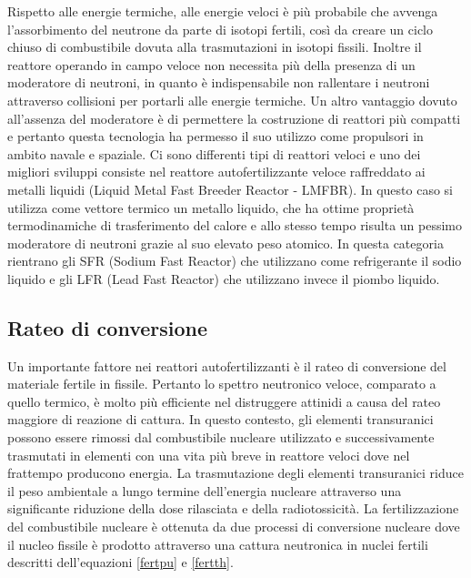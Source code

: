 Rispetto alle energie
termiche, alle energie veloci è più probabile che avvenga l'assorbimento del neutrone da parte di isotopi fertili, 
così da creare un ciclo chiuso di combustibile dovuta alla trasmutazioni in isotopi fissili.
Inoltre il reattore operando in campo veloce non necessita più della presenza 
di un moderatore di neutroni, in quanto è indispensabile non rallentare i neutroni 
attraverso collisioni per portarli alle energie termiche.
Un altro vantaggio dovuto all'assenza del moderatore è di permettere la costruzione di 
reattori più compatti e pertanto questa tecnologia ha permesso il suo utilizzo come propulsori in ambito 
navale e spaziale.
Ci sono differenti tipi di reattori veloci e uno dei migliori sviluppi 
consiste 
nel reattore autofertilizzante veloce raffreddato ai metalli liquidi (Liquid 
Metal Fast Breeder Reactor - LMFBR).
In questo caso si utilizza come vettore termico un metallo liquido, che ha 
ottime proprietà termodinamiche di trasferimento del calore e allo stesso tempo 
risulta un pessimo moderatore di neutroni grazie al suo elevato peso atomico.
In questa categoria rientrano gli SFR (Sodium Fast Reactor) che utilizzano come 
refrigerante il sodio liquido e gli LFR (Lead Fast Reactor) che utilizzano 
invece il piombo liquido.

\subsection{Rateo di conversione}
Un importante fattore nei reattori autofertilizzanti è il rateo di conversione 
del 
materiale fertile in fissile.
Pertanto lo spettro neutronico veloce, comparato a quello termico, è molto più 
efficiente nel distruggere attinidi a causa del rateo maggiore di reazione di cattura.
In questo contesto, gli elementi transuranici possono essere rimossi dal 
combustibile nucleare utilizzato e successivamente trasmutati in elementi con 
una vita più breve in reattore veloci dove nel frattempo producono energia.
La trasmutazione degli elementi transuranici riduce il peso ambientale a lungo 
termine dell'energia nucleare attraverso una significante riduzione della dose 
rilasciata e della radiotossicità.
La fertilizzazione del combustibile nucleare è ottenuta da due processi di 
conversione nucleare dove il nucleo fissile è prodotto attraverso una cattura 
neutronica in nuclei fertili descritti dell'equazioni \eqref{fertpu} e 
\eqref{fertth}.

